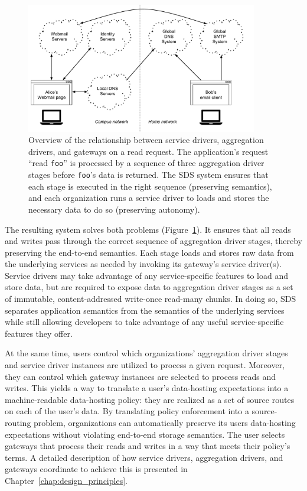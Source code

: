 \begin{figure}[h]
   \centering
   \includegraphics[width=0.9\textwidth,page=33]{figures/dissertation-figures}
   \caption{Overview of the relationship between service drivers, aggregation
   drivers, and gateways on a read request.  The application's request ``read \texttt{foo}'' is
   processed by a sequence of three aggregation driver stages before
   \texttt{foo}'s data is returned.  The SDS system ensures that each stage is
   executed in the right sequence (preserving semantics),
   and each organization runs a service driver to loads and stores the
   necessary data to do so (preserving autonomy).}
   \label{fig:chap1-sds-implementation-overview}
\end{figure}

The resulting system solves both problems
(Figure~\ref{fig:chap1-sds-implementation-overview}).
It ensures that all reads and writes pass through the
correct sequence of aggregation driver
stages, thereby preserving the end-to-end semantics.  Each stage
loads and stores raw data from the underlying services as needed
by invoking its gateway's service driver(s).  Service drivers may take advantage
of any service-specific features to load and store data, but are required to
expose data to aggregation driver stages as a set of immutable,
content-addressed write-once read-many chunks.  In doing so, SDS separates
application semantics from the semantics of the underlying services while still
allowing developers to take advantage of any useful service-specific
features they offer.

At the same time, users 
control which organizations' aggregation driver stages and service driver
instances are utilized to process a given request.  Moreover, they can control
which gateway instances are selected to process reads and writes.  This yields a way to
translate a user's data-hosting expectations into a
machine-readable data-hosting policy:  they are realized as a set of source
routes on each of the user's data.  By translating policy enforcement into
a source-routing problem, organizations can automatically
preserve its users data-hosting expectations without
violating end-to-end storage semantics.  The user selects gateways that process
their reads and writes in a way that meets their policy's terms.
A detailed description of how service drivers, aggregation
drivers, and gateways coordinate to achieve this is presented in
Chapter~\ref{chap:design_principles}.

